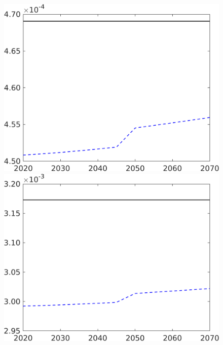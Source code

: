 \begin{figure}[h!!]
\begin{minipage}[]{0.32\textwidth}
	\end{minipage}
	\begin{minipage}[]{0.32\textwidth}
		\includegraphics[width=1\textwidth]{../../codding_model/own_basedOnFried/optimalPol_190722_tidiedUp/figures/all_10Aout22/CountTaul_modxgr_target_Lg_spillover0_sep1_extern0_PV1_etaa0.79_lgd0.png}
	\end{minipage}
	\begin{minipage}[]{0.32\textwidth}
		\includegraphics[width=1\textwidth]{../../codding_model/own_basedOnFried/optimalPol_190722_tidiedUp/figures/all_10Aout22/CountTaul_modxgr_target_Lf_spillover0_sep1_extern0_PV1_etaa0.79_lgd0.png}

\end{minipage}
\end{figure}
